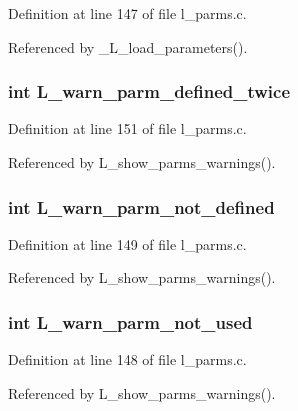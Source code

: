 Definition at line 147 of file l\_\-parms.c.

Referenced by \_\-L\_\-load\_\-parameters().
\subsubsection{\setlength{\rightskip}{0pt plus 5cm}int \bf{L\_\-warn\_\-parm\_\-defined\_\-twice}}\label{l__parms_8h_ecc63b1ae2816e4e5b67830cefcc725b}




Definition at line 151 of file l\_\-parms.c.

Referenced by L\_\-show\_\-parms\_\-warnings().
\subsubsection{\setlength{\rightskip}{0pt plus 5cm}int \bf{L\_\-warn\_\-parm\_\-not\_\-defined}}\label{l__parms_8h_3e945935cb7d3ea887b8309a40b01ea8}




Definition at line 149 of file l\_\-parms.c.

Referenced by L\_\-show\_\-parms\_\-warnings().
\subsubsection{\setlength{\rightskip}{0pt plus 5cm}int \bf{L\_\-warn\_\-parm\_\-not\_\-used}}\label{l__parms_8h_6e2370b0d062442e4748c92dbfe6260b}




Definition at line 148 of file l\_\-parms.c.

Referenced by L\_\-show\_\-parms\_\-warnings().